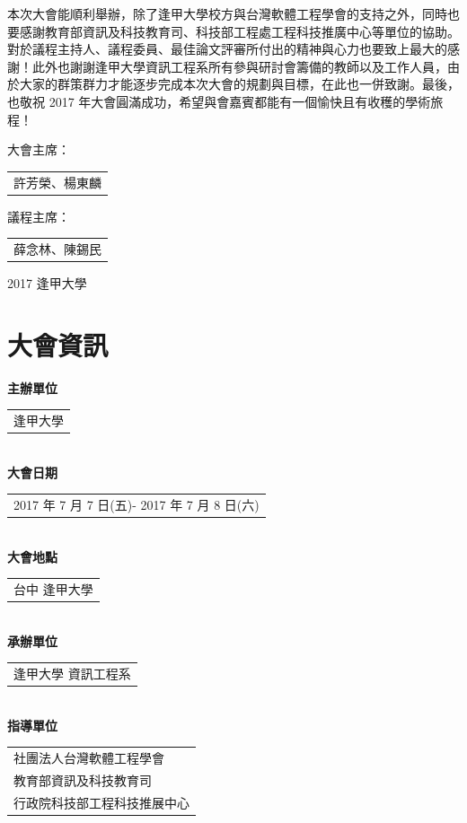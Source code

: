 \documentclass[12pt,oneside,a4paper]{book}
\newcommand{\mIndent}{\hspace{.5cm}}
\begin{document}
\mIndent 本次大會能順利舉辦，除了逢甲大學校方與台灣軟體工程學會的支持之外，同時也要感謝教育部資訊及科技教育司、科技部工程處工程科技推廣中心等單位的協助。對於議程主持人、議程委員、最佳論文評審所付出的精神與心力也要致上最大的感謝！此外也謝謝逢甲大學資訊工程系所有參與研討會籌備的教師以及工作人員，由於大家的群策群力才能逐步完成本次大會的規劃與目標，在此也一併致謝。最後，也敬祝 2017 年大會圓滿成功，希望與會嘉賓都能有一個愉快且有收穫的學術旅程！

\vspace{1cm}

大會主席：
\begin{tabular}{l}
許芳榮、楊東麟 
\end{tabular}

議程主席：
\begin{tabular}{l}
薛念林、陳錫民
\end{tabular}

2017 逢甲大學

\setcounter{tocdepth}{1} %
\tableofcontents\label{toc}
\setcounter{chapter}{0}



\chapter*{大會資訊}
%

\textbf{主辦單位} 
\begin{tabular}{l}
逢甲大學
\end{tabular}
\\

\textbf{大會日期}
\begin{tabular}{l}
2017 年 7 月 7 日(五)- 2017 年 7 月 8 日(六)
\end{tabular}
\\

\textbf{大會地點}
\begin{tabular}{l}
台中 逢甲大學\\
\end{tabular}
\\

\textbf{承辦單位}
\begin{tabular}{l}
逢甲大學 資訊工程系\\
\end{tabular}
\\

\textbf{指導單位}
\begin{tabular}{l}
社團法人台灣軟體工程學會\\
教育部資訊及科技教育司\\
行政院科技部工程科技推展中心\\
\end{tabular}
\\
\end{document}
